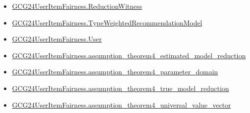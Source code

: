 \documentclass[10pt]{article}
\begin{document}
\begin{itemize}
\item \hyperlink{governing-declaration-09e04866bceb3cdb}{GCG24\allowbreak{}User\allowbreak{}Item\allowbreak{}Fairness.\allowbreak{}Reduction\allowbreak{}Witness}
\item \hyperlink{governing-declaration-9d0d71ba8ee67837}{GCG24\allowbreak{}User\allowbreak{}Item\allowbreak{}Fairness.\allowbreak{}Type\allowbreak{}Weighted\allowbreak{}Recommendation\allowbreak{}Model}
\item \hyperlink{governing-declaration-800dd691bc989470}{GCG24\allowbreak{}User\allowbreak{}Item\allowbreak{}Fairness.\allowbreak{}User}
\item \hyperlink{paper-prerequisite-0056dab12fde2982}{GCG24\allowbreak{}User\allowbreak{}Item\allowbreak{}Fairness.\allowbreak{}assumption\_\allowbreak{}theorem4\_\allowbreak{}estimated\_\allowbreak{}model\_\allowbreak{}reduction}
\item \hyperlink{paper-prerequisite-1dad1af38bc71ab1}{GCG24\allowbreak{}User\allowbreak{}Item\allowbreak{}Fairness.\allowbreak{}assumption\_\allowbreak{}theorem4\_\allowbreak{}parameter\_\allowbreak{}domain}
\item \hyperlink{paper-prerequisite-c46e8e73b66a828e}{GCG24\allowbreak{}User\allowbreak{}Item\allowbreak{}Fairness.\allowbreak{}assumption\_\allowbreak{}theorem4\_\allowbreak{}true\_\allowbreak{}model\_\allowbreak{}reduction}
\item \hyperlink{paper-prerequisite-7f385233e754d0d8}{GCG24\allowbreak{}User\allowbreak{}Item\allowbreak{}Fairness.\allowbreak{}assumption\_\allowbreak{}theorem4\_\allowbreak{}universal\_\allowbreak{}value\_\allowbreak{}vector}
\end{itemize}
\end{document}
